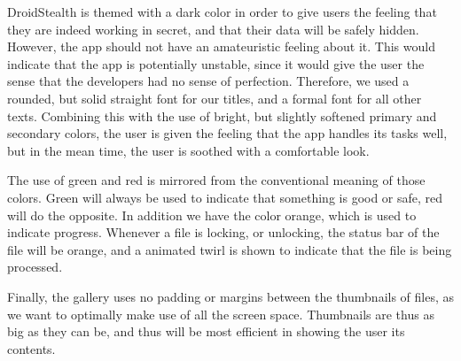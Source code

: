 DroidStealth is themed with a dark color in order to give users the feeling that they are indeed
working in secret, and that their data will be safely hidden. However, the app should not
have an amateuristic feeling about it. This would indicate that the app is potentially unstable, 
since it would give the user the sense that the developers had no sense of perfection. 
Therefore, we used a rounded, but solid straight font for our titles, and a formal font for 
all other texts. Combining this with the use of bright, but slightly softened primary and 
secondary colors, the user is given the feeling that the app handles its tasks well, but in 
the mean time, the user is soothed with a comfortable look. %

The use of green and red is mirrored from the conventional meaning of those colors. Green 
will always be used to indicate that something is good or safe, red will do the opposite. 
In addition we have the color orange, which is used to indicate progress. Whenever a file is 
locking, or unlocking, the status bar of the file will be orange, and a animated twirl is shown 
to indicate that the file is being processed. %

Finally, the gallery uses no padding or margins between the thumbnails of files, as we want 
to optimally make use of all the screen space. Thumbnails are thus as big as they can be, 
and thus will be most efficient in showing the user its contents. 
